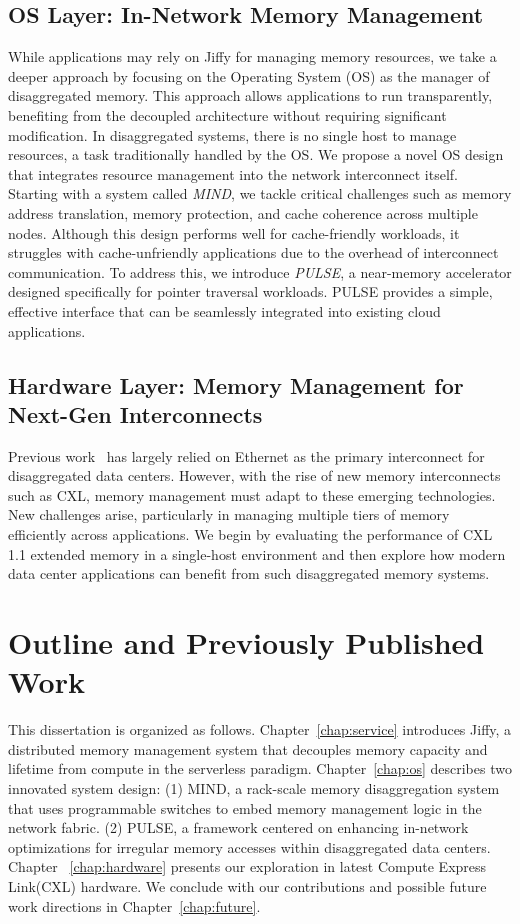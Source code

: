 \subsection{OS Layer: In-Network Memory Management}

While applications may rely on Jiffy for managing memory resources, we take a deeper approach by focusing on the Operating System (OS) as the manager of disaggregated memory. This approach allows applications to run transparently, benefiting from the decoupled architecture without requiring significant modification. In disaggregated systems, there is no single host to manage resources, a task traditionally handled by the OS. We propose a novel OS design that integrates resource management into the network interconnect itself. Starting with a system called \textit{MIND}, we tackle critical challenges such as memory address translation, memory protection, and cache coherence across multiple nodes. Although this design performs well for cache-friendly workloads, it struggles with cache-unfriendly applications due to the overhead of interconnect communication. To address this, we introduce \textit{PULSE}, a near-memory accelerator designed specifically for pointer traversal workloads. PULSE provides a simple, effective interface that can be seamlessly integrated into existing cloud applications.

\subsection{Hardware Layer: Memory Management for Next-Gen Interconnects}
Previous work~\cite{mind, legoos} has largely relied on Ethernet as the primary interconnect for disaggregated data centers. However, with the rise of new memory interconnects such as CXL, memory management must adapt to these emerging technologies. New challenges arise, particularly in managing multiple tiers of memory efficiently across applications. We begin by evaluating the performance of CXL 1.1 extended memory in a single-host environment and then explore how modern data center applications can benefit from such disaggregated memory systems.

\section{Outline and Previously Published Work}

This dissertation is organized as follows. Chapter~\ref{chap:service} introduces Jiffy, a distributed memory management system that decouples memory capacity and lifetime from compute in the serverless paradigm. Chapter~\ref{chap:os} describes two innovated system design: (1) MIND, a rack-scale memory disaggregation system that uses programmable switches to embed memory management logic in
the network fabric. (2) PULSE, a framework centered on enhancing in-network optimizations for
irregular memory accesses within disaggregated data centers. Chapter ~\ref{chap:hardware} presents our exploration in latest Compute Express Link(CXL) hardware. We conclude with our contributions and possible future work directions in Chapter~\ref{chap:future}.

